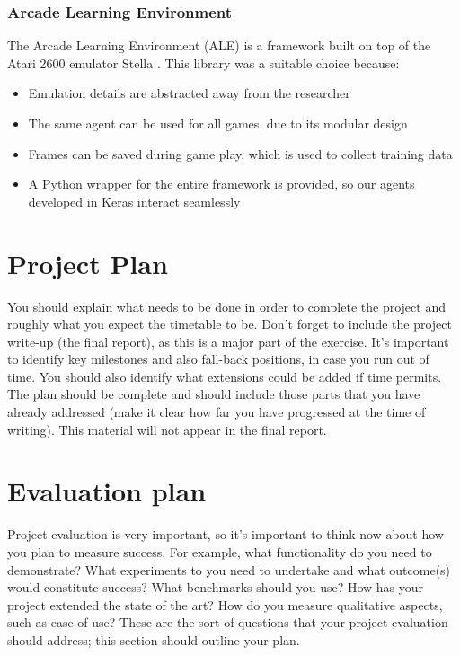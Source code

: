 \documentclass[12pt,twoside]{article}
\begin{document}
\subsubsection{Arcade Learning Environment}
The Arcade Learning Environment (ALE) is a framework built on top of the Atari 2600 emulator Stella \cite{Bellemare2015}. This library was a suitable choice because:
\begin{itemize}
\item Emulation details are abstracted away from the researcher
\item The same agent can be used for all games, due to its modular design
\item Frames can be saved during game play, which is used to collect training data
\item A Python wrapper for the entire framework is provided, so our agents developed in Keras interact seamlessly
\end{itemize}

\section{Project Plan}
You should explain what needs to be done in order to complete the project and roughly what you expect the timetable to be. Don’t forget to include the project write-up (the final report), as this is a major part of the exercise. It’s important to identify key milestones and also fall-back positions, in case you run out of time.  You should also identify what extensions could be added if time permits.  The plan should be complete and should include those parts that you have already addressed (make it clear how far you have progressed at the time of writing).  This material will not appear in the final report.

\section{Evaluation plan}
Project evaluation is very important, so it's important to think now about how you plan to measure success. For example, what functionality do you need to demonstrate?  What experiments to you need to undertake and what outcome(s) would constitute success?  What benchmarks should you use? How has your project extended the state of the art?  How do you measure qualitative aspects, such as ease of use?  These are the sort of questions that your project evaluation should address; this section should outline your plan.


\end{document}
